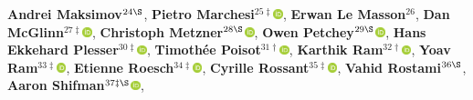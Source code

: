 \textbf{Andrei Maksimov}$^{24\S}$,
\textbf{Pietro Marchesi}$^{25\ddagger}$\href{http://orcid.org/0000-0001-5955-6909}{\includegraphics[width=8pt]{orcid}},
\textbf{Erwan Le Masson}$^{26}$,
\textbf{Dan McGlinn}$^{27\ddagger}$\href{http://orcid.org/0000-0003-2359-3526}{\includegraphics[width=8pt]{orcid}},
\textbf{Christoph Metzner}$^{28\S}$\href{http://orcid.org/0000-0002-5933-2101}{\includegraphics[width=8pt]{orcid}},
\textbf{Owen Petchey}$^{29\S}$\href{http://orcid.org/0000-0002-7724-1633}{\includegraphics[width=8pt]{orcid}},
\textbf{Hans Ekkehard Plesser}$^{30\ddagger}$\href{http://orcid.org/0000-0001-7843-5993}{\includegraphics[width=8pt]{orcid}},
\textbf{Timothée Poisot}$^{31\dagger}$\href{http://orcid.org/0000-0002-0735-5184}{\includegraphics[width=8pt]{orcid}},
\textbf{Karthik Ram}$^{32\dagger}$\href{http://orcid.org/0000-0002-0233-1757}{\includegraphics[width=8pt]{orcid}},
\textbf{Yoav Ram}$^{33\ddagger}$\href{http://orcid.org/0000-0002-9653-4458}{\includegraphics[width=8pt]{orcid}},
\textbf{Etienne Roesch}$^{34\ddagger}$\href{http://orcid.org/0000-0002-8913-4173}{\includegraphics[width=8pt]{orcid}},
\textbf{Cyrille Rossant}$^{35\ddagger}$\href{http://orcid.org/0000-0003-2069-9093}{\includegraphics[width=8pt]{orcid}},
\textbf{Vahid Rostami}$^{36\S}$,
\textbf{Aaron Shifman}$^{37\ddagger\S}$\href{http://orcid.org/0000-0003-2140-7590}{\includegraphics[width=8pt]{orcid}},
